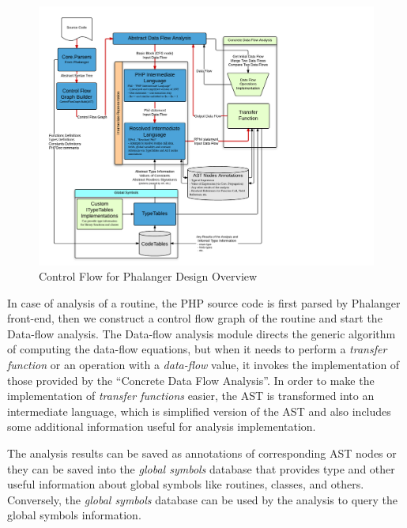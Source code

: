 \begin{figure}[h]  
  \centering
    \includegraphics*[width=\textwidth,height=\textheight,keepaspectratio,viewport=0 15 565 590]{img/ControlFlowModules.pdf}  
    \caption{Control Flow for Phalanger Design Overview\label{overalldiagram}}
\end{figure}

    In case of analysis of a routine, the PHP source code is first 
    parsed by Phalanger front-end, then we construct a control 
    flow graph of the routine and start the Data-flow analysis. 
    The Data-flow analysis module directs the generic algorithm of 
    computing the data-flow equations, but when it needs to 
    perform a \emph{transfer function} or an operation with 
    a \emph{data-flow} value, it invokes the implementation of 
    those provided by the ``Concrete Data Flow Analysis''. 
    In order to make the implementation of \emph{transfer functions} 
    easier, the AST is transformed into an intermediate 
    language, which is simplified version of the AST and also 
    includes some additional information useful for analysis 
    implementation.
    
    The analysis results can be saved as annotations of 
    corresponding AST nodes or they can be saved into the 
    \emph{global symbols} database that provides type and 
    other useful information about global symbols like 
    routines, classes, and others. Conversely, the 
    \emph{global symbols} database can be used by the 
    analysis to query the global symbols information.
    
